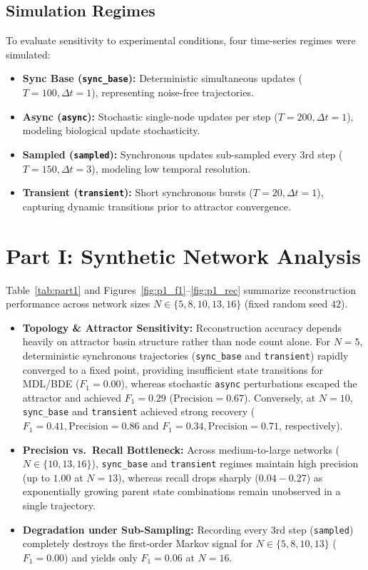 \documentclass[11pt,a4paper]{article}
\begin{document}
\subsection{Simulation Regimes}
To evaluate sensitivity to experimental conditions, four time-series regimes were simulated:
\begin{itemize}
    \item \textbf{Sync Base (\texttt{sync\_base}):} Deterministic simultaneous updates ($T = 100, \Delta t = 1$), representing noise-free trajectories.
    \item \textbf{Async (\texttt{async}):} Stochastic single-node updates per step ($T = 200, \Delta t = 1$), modeling biological update stochasticity.
    \item \textbf{Sampled (\texttt{sampled}):} Synchronous updates sub-sampled every 3rd step ($T = 150, \Delta t = 3$), modeling low temporal resolution.
    \item \textbf{Transient (\texttt{transient}):} Short synchronous bursts ($T = 20, \Delta t = 1$), capturing dynamic transitions prior to attractor convergence.
\end{itemize}

\section{Part I: Synthetic Network Analysis}

Table~\ref{tab:part1} and Figures~\ref{fig:p1_f1}--\ref{fig:p1_rec} summarize reconstruction performance across network sizes $N \in \{5, 8, 10, 13, 16\}$ (fixed random seed $42$).

\begin{itemize}
    \item \textbf{Topology \& Attractor Sensitivity:} Reconstruction accuracy depends heavily on attractor basin structure rather than node count alone. For $N = 5$, deterministic synchronous trajectories (\texttt{sync\_base} and \texttt{transient}) rapidly converged to a fixed point, providing insufficient state transitions for MDL/BDE ($F_1 = 0.00$), whereas stochastic \texttt{async} perturbations escaped the attractor and achieved $F_1 = 0.29$ ($\text{Precision} = 0.67$). Conversely, at $N = 10$, \texttt{sync\_base} and \texttt{transient} achieved strong recovery ($F_1 = 0.41, \text{Precision} = 0.86$ and $F_1 = 0.34, \text{Precision} = 0.71$, respectively).
    \item \textbf{Precision vs.\ Recall Bottleneck:} Across medium-to-large networks ($N \in \{10, 13, 16\}$), \texttt{sync\_base} and \texttt{transient} regimes maintain high precision (up to $1.00$ at $N = 13$), whereas recall drops sharply ($0.04 - 0.27$) as exponentially growing parent state combinations remain unobserved in a single trajectory.
    \item \textbf{Degradation under Sub-Sampling:} Recording every 3rd step (\texttt{sampled}) completely destroys the first-order Markov signal for $N \in \{5, 8, 10, 13\}$ ($F_1 = 0.00$) and yields only $F_1 = 0.06$ at $N = 16$.
\end{itemize}
\end{document}
